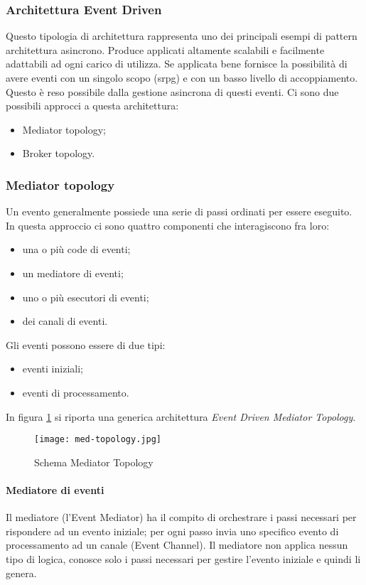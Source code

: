 \subsubsection{Architettura Event Driven}
Questo tipologia di architettura rappresenta uno dei principali esempi di pattern architettura asincrono. Produce applicati altamente scalabili e facilmente adattabili ad ogni carico di utilizza. Se applicata bene fornisce la possibilità di avere eventi con un singolo scopo (\gls{srpg}\glsfirstoccur) e con un basso livello di accoppiamento. Questo è reso possibile dalla gestione asincrona di questi eventi.
Ci sono due possibili approcci a questa architettura:
\begin{itemize}
    \item Mediator topology;
    \item Broker topology.
\end{itemize}
\subsubsection{Mediator topology}
Un evento generalmente possiede una serie di passi ordinati per essere eseguito. In questa approccio ci sono quattro componenti che interagiscono fra loro:
\begin{itemize}
    \item una o più code di eventi;
    \item un mediatore di eventi;
    \item uno o più esecutori di eventi;
    \item dei canali di eventi.
\end{itemize}
    
Gli eventi possono essere di due tipi:
\begin{itemize}
    \item eventi iniziali;
    \item eventi di processamento.
\end{itemize}
    
In figura \ref{fig:eventdriver-med-top} si riporta una generica architettura \emph{Event Driven Mediator Topology}.   
\begin{figure}[htbp]
    \centering
    \texttt{[image: med-topology.jpg]} 
    \caption{Schema Mediator Topology}
    \label{fig:eventdriver-med-top} 
\end{figure}

\paragraph{Mediatore di eventi}
Il mediatore (l’Event Mediator) ha il compito di orchestrare i passi necessari per rispondere ad un evento iniziale; per ogni passo invia uno specifico evento di processamento ad un canale (Event Channel). Il mediatore non applica nessun tipo di logica, conosce solo i passi necessari per gestire l’evento iniziale e quindi li genera.
